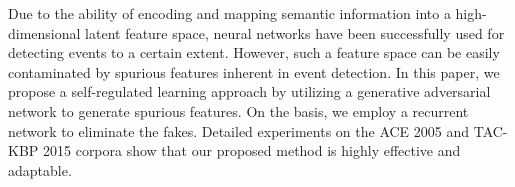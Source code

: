 Due to the ability of encoding and mapping semantic information into a high-dimensional latent feature space, neural networks have been successfully used for detecting events to a certain extent. However, such a feature space can be easily contaminated by spurious features inherent in event detection. In this paper, we propose a self-regulated learning approach by utilizing a generative adversarial network to generate spurious features. On the basis, we employ a recurrent network to eliminate the fakes. Detailed experiments on the ACE 2005 and TAC-KBP 2015 corpora show that our proposed method is highly effective and adaptable.
